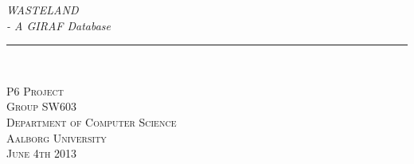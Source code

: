 \thispagestyle{empty}
\begin{flushright}
\vspace{3cm}

\phantom{hul}

\phantom{hul}

\phantom{hul}

\textsl{\Huge WASTELAND}\\ \vspace{0.3cm}
\textsl{\Huge - A GIRAF Database} \vspace{0.5cm}

\rule{13cm}{3mm} \\ \vspace{1.5cm}
\vspace{1cm}


\vspace{1.5cm} 
\textsc{\Large P6 Project \\
Group SW603 \\
Department of Computer Science\\
Aalborg University\\
June 4th 2013\\}
\end{flushright}
